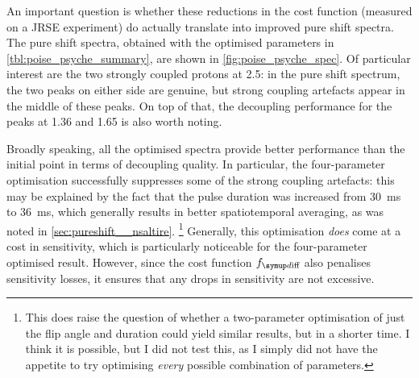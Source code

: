 An important question is whether these reductions in the cost function (measured on a JRSE experiment) do actually translate into improved pure shift spectra.
The pure shift spectra, obtained with the optimised parameters in \cref{tbl:poise_psyche_summary}, are shown in \cref{fig:poise_psyche_spec}.
Of particular interest are the two strongly coupled protons at \qty{2.5}{\ppm}: in the pure shift spectrum, the two peaks on either side are genuine, but strong coupling artefacts appear in the middle of these peaks.
On top of that, the decoupling performance for the peaks at \qty{1.36}{\ppm} and \qty{1.65}{\ppm} is also worth noting.

Broadly speaking, all the optimised spectra provide better performance than the initial point in terms of decoupling quality.
In particular, the four-parameter optimisation successfully suppresses some of the strong coupling artefacts: this may be explained by the fact that the pulse duration was increased from \qty{30}{\ms} to \qty{36}{\ms}, which generally results in better spatiotemporal averaging, as was noted in \cref{sec:pureshift__nsaltire}.%
\footnote{This does raise the question of whether a two-parameter optimisation of just the flip angle and duration could yield similar results, but in a shorter time. I think it is possible, but I did not test this, as I simply did not have the appetite to try optimising \textit{every} possible combination of parameters.}
Generally, this optimisation \textit{does} come at a cost in sensitivity, which is particularly noticeable for the four-parameter optimised result.
However, since the cost function $\fdiff$ also penalises sensitivity losses, it ensures that any drops in sensitivity are not excessive.


